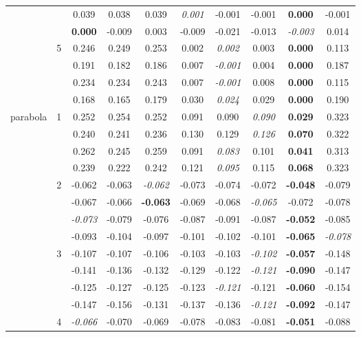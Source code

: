 \documentclass[authoryear, review, 11pt]{elsarticle}
\begin{document}
\begin{table}
\begin{center}
{\begin{tabular}{cccccccccc}
&  & 0.039 & 0.038 & 0.039 & \emph{0.001} & -0.001 & -0.001 & \textbf{0.000} & -0.001 \\ 
&  & \textbf{0.000} & -0.009 & 0.003 & -0.009 & -0.021 & -0.013 & \emph{-0.003} & 0.014 \\ 
		  \cline{3-10}
		  & \multirow{4}{*}{5} & 0.246 & 0.249 & 0.253 & 0.002 & \emph{0.002} & 0.003 & \textbf{0.000} & 0.113 \\ 
&  & 0.191 & 0.182 & 0.186 & 0.007 & \emph{-0.001} & 0.004 & \textbf{0.000} & 0.187 \\ 
&  & 0.234 & 0.234 & 0.243 & 0.007 & \emph{-0.001} & 0.008 & \textbf{0.000} & 0.115 \\ 
&  & 0.168 & 0.165 & 0.179 & 0.030 & \emph{0.024} & 0.029 & \textbf{0.000} & 0.190 \\ 
		  \hline	  
		  \multirow{20}{*}{parabola} & \multirow{4}{*}{1} & 0.252 & 0.254 & 0.252 & 0.091 & 0.090 & \emph{0.090} & \textbf{0.029} & 0.323 \\ 
&  & 0.240 & 0.241 & 0.236 & 0.130 & 0.129 & \emph{0.126} & \textbf{0.070} & 0.322 \\ 
&  & 0.262 & 0.245 & 0.259 & 0.091 & \emph{0.083} & 0.101 & \textbf{0.041} & 0.313 \\ 
&  & 0.239 & 0.222 & 0.242 & 0.121 & \emph{0.095} & 0.115 & \textbf{0.068} & 0.323 \\ 
		  \cline{3-10}
		  & \multirow{4}{*}{2} & -0.062 & -0.063 & \emph{-0.062} & -0.073 & -0.074 & -0.072 & \textbf{-0.048} & -0.079 \\ 
&  & -0.067 & -0.066 & \textbf{-0.063} & -0.069 & -0.068 & \emph{-0.065} & -0.072 & -0.078 \\ 
&  & \emph{-0.073} & -0.079 & -0.076 & -0.087 & -0.091 & -0.087 & \textbf{-0.052} & -0.085 \\ 
&  & -0.093 & -0.104 & -0.097 & -0.101 & -0.102 & -0.101 & \textbf{-0.065} & \emph{-0.078} \\
		  \cline{3-10}
		  & \multirow{4}{*}{3} & -0.107 & -0.107 & -0.106 & -0.103 & -0.103 & \emph{-0.102} & \textbf{-0.057} & -0.148 \\ 
&  & -0.141 & -0.136 & -0.132 & -0.129 & -0.122 & \emph{-0.121} & \textbf{-0.090} & -0.147 \\ 
&  & -0.125 & -0.127 & -0.125 & -0.123 & \emph{-0.121} & -0.121 & \textbf{-0.060} & -0.154 \\ 
&  & -0.147 & -0.156 & -0.131 & -0.137 & -0.136 & \emph{-0.121} & \textbf{-0.092} & -0.147 \\ 
		  \cline{3-10}
		  & \multirow{4}{*}{4} & \emph{-0.066} & -0.070 & -0.069 & -0.078 & -0.083 & -0.081 & \textbf{-0.051} & -0.088 \\ 

\end{tabular}}
\end{center}
\end{table}
\end{document}

